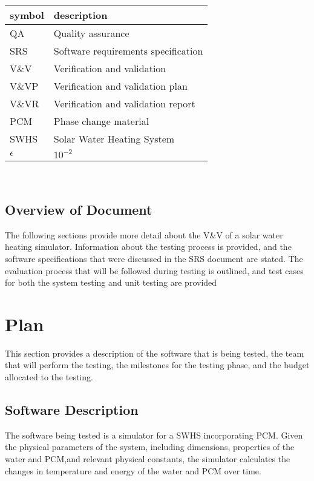 \documentclass[12pt]{article}
\begin{document}
\renewcommand{\arraystretch}{1.2}
\begin{tabular}{l l} 
  \toprule		
  \textbf{symbol} & \textbf{description}\\
  \midrule 
  QA		&Quality assurance\\
  SRS		&Software requirements specification\\
  V\&V		& Verification and validation\\
  V\&VP 	& Verification and validation plan\\
  V\&VR 	& Verification and validation report\\
  PCM		& Phase change material\\
  SWHS		& Solar Water Heating System\\
  $\epsilon$& $10^{-2}$\\
  \bottomrule
\end{tabular}\\

\subsection{Overview of Document }
The following sections provide more detail about the V\&V of a solar water heating
 simulator. Information about the testing process is provided, and the software specifications
that were discussed in the SRS document are stated.  The evaluation process that will be followed during 
testing is outlined, and test cases for both the system testing and unit testing are provided 

%
%

\section{Plan}
This section provides a description of the software that is being tested, the team that will
perform the testing, the milestones for the testing phase, and the budget allocated to the testing. 

\subsection{Software Description}
The software being tested is a simulator for a SWHS
incorporating PCM. Given the physical parameters of the system,
 including dimensions, properties of the water and PCM,and relevant physical constants,
  the simulator calculates the changes in temperature and energy of the water and PCM 
  over time.
\end{document}
